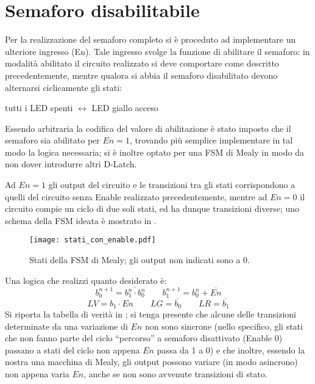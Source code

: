 \section{Semaforo disabilitabile}

Per la realizzazione del semaforo completo si è proceduto ad implementare un ulteriore ingresso (En). Tale ingresso svolge la funzione di abilitare il semaforo: in modalità abilitato il circuito realizzato si deve comportare come descritto precedentemente, mentre qualora si abbia il semaforo disabilitato devono alternarsi ciclicamente gli stati:
\begin{center}
tutti i LED spenti $\longleftrightarrow$ LED giallo acceso
\end{center}
Essendo arbitraria la codifica del valore di abilitazione è stato imposto che il semaforo sia abilitato
per $En = 1$, trovando più semplice implementare in tal modo la logica necessaria; si è inoltre optato per una FSM di Mealy in modo da non dover introdurre altri D-Latch.

Ad $En = 1$ gli output del circuito e le transizioni tra gli stati corrispondono a quelli del circuito senza Enable realizzato precedentemente, mentre ad $En = 0$ il circuito compie un ciclo di due soli stati, ed ha dunque transizioni diverse; uno schema della FSM ideata è mostrato in .

\begin{figure}[h]
	\centering
	\texttt{[image: stati\_con\_enable.pdf]}
	\caption{Stati della FSM di Mealy; gli output non indicati sono a 0.}
	\label{fig:enstates}
\end{figure}

Una logica che realizzi quanto desiderato è:
$$b_0^{n+1} =  \overline{b_{1}^{n} \cdot b_{0}^{n}} \qquad b_1^{n+1} = b_0^{n} + \overline{En}$$
$$LV = b_1 \cdot En \qquad LG = \overline{b_0} \qquad LR = \overline{b_1}$$
Si riporta la tabella di verità in ; si tenga presente che alcune delle transizioni determinate da una variazione di $En$ non sono sincrone (nello specifico, gli stati che non fanno parte del ciclo ``percorso'' a semaforo disattivato (Enable 0) passano a stati del ciclo non appena $En$ passa da 1 a 0) e che inoltre, essendo la nostra una macchina di Mealy, gli output possono variare (in modo asincrono) non appena varia $En$, anche se non sono avvenute transizioni di stato.


